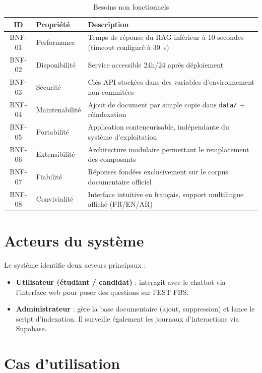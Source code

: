 \documentclass[12pt, a4paper, twoside]{report}
\newcommand{\file}[1]{\texttt{\footnotesize #1}}
\begin{document}
\begin{table}[H]
\centering
\caption{Besoins non fonctionnels}
\label{tab:besoins-nf}
\begin{tabularx}{\textwidth}{c l X}
\toprule
\rowcolor{primary!10}
\textbf{ID} & \textbf{Propriété} & \textbf{Description} \\
\midrule
BNF-01 & Performance & Temps de réponse du RAG inférieur à 10 secondes (timeout configuré à 30~s) \\
BNF-02 & Disponibilité & Service accessible 24h/24 après déploiement \\
BNF-03 & Sécurité & Clés API stockées dans des variables d'environnement non commitées \\
BNF-04 & Maintenabilité & Ajout de document par simple copie dans \file{data/} + réindexation \\
BNF-05 & Portabilité & Application conteneurisable, indépendante du système d'exploitation \\
BNF-06 & Extensibilité & Architecture modulaire permettant le remplacement des composants \\
BNF-07 & Fiabilité & Réponses fondées exclusivement sur le corpus documentaire officiel \\
BNF-08 & Convivialité & Interface intuitive en français, support multilingue affiché (FR/EN/AR) \\
\bottomrule
\end{tabularx}
\end{table}

\section{Acteurs du système}

Le système identifie deux acteurs principaux :

\begin{itemize}
  \item \textbf{Utilisateur (étudiant / candidat)} : interagit avec le chatbot via l'interface web pour poser des questions sur l'EST FBS.
  \item \textbf{Administrateur} : gère la base documentaire (ajout, suppression) et lance le script d'indexation. Il surveille également les journaux d'interactions via Supabase.
\end{itemize}

\section{Cas d'utilisation}
\end{document}
